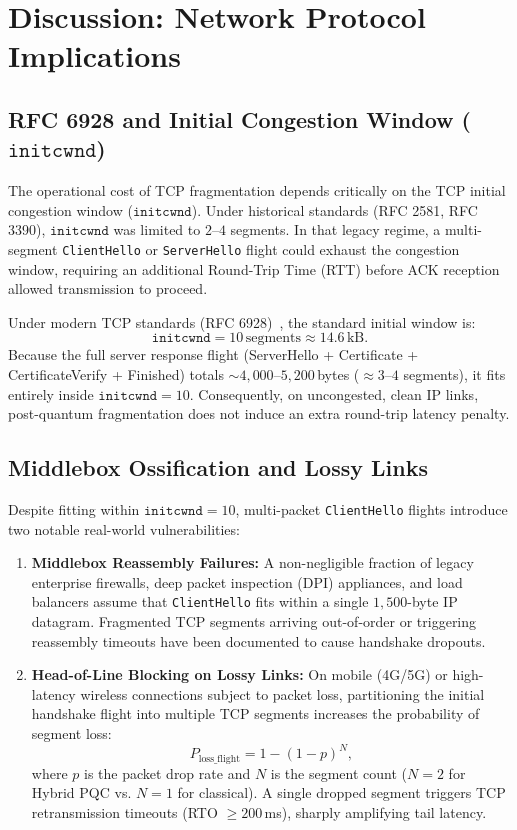 \section{Discussion: Network Protocol Implications}

\subsection{RFC 6928 and Initial Congestion Window (\texorpdfstring{$\texttt{initcwnd}$}{initcwnd})}
The operational cost of TCP fragmentation depends critically on the TCP initial congestion window ($\texttt{initcwnd}$). Under historical standards (RFC 2581, RFC 3390), $\texttt{initcwnd}$ was limited to $2\text{--}4$ segments. In that legacy regime, a multi-segment \texttt{ClientHello} or \texttt{ServerHello} flight could exhaust the congestion window, requiring an additional Round-Trip Time (RTT) before ACK reception allowed transmission to proceed.

Under modern TCP standards (RFC 6928)~\cite{chu2013}, the standard initial window is:
\begin{equation}
\texttt{initcwnd} = 10\,\mathrm{segments} \approx 14.6\,\mathrm{kB}.
\end{equation}
Because the full server response flight (ServerHello + Certificate + CertificateVerify + Finished) totals $\sim 4{,}000\text{--}5{,}200\,$bytes ($\approx 3\text{--}4$ segments), it fits entirely inside $\texttt{initcwnd} = 10$. Consequently, on uncongested, clean IP links, post-quantum fragmentation does not induce an extra round-trip latency penalty.

\subsection{Middlebox Ossification and Lossy Links}
Despite fitting within $\texttt{initcwnd} = 10$, multi-packet \texttt{ClientHello} flights introduce two notable real-world vulnerabilities:
\begin{enumerate}
    \item \textbf{Middlebox Reassembly Failures:} A non-negligible fraction of legacy enterprise firewalls, deep packet inspection (DPI) appliances, and load balancers assume that \texttt{ClientHello} fits within a single $1{,}500$-byte IP datagram. Fragmented TCP segments arriving out-of-order or triggering reassembly timeouts have been documented to cause handshake dropouts.
    \item \textbf{Head-of-Line Blocking on Lossy Links:} On mobile (4G/5G) or high-latency wireless connections subject to packet loss, partitioning the initial handshake flight into multiple TCP segments increases the probability of segment loss:
    \begin{equation}
    P_{\mathrm{loss\_flight}} = 1 - (1 - p)^N,
    \end{equation}
    where $p$ is the packet drop rate and $N$ is the segment count ($N=2$ for Hybrid PQC vs. $N=1$ for classical). A single dropped segment triggers TCP retransmission timeouts (RTO $\ge 200\,$ms), sharply amplifying tail latency.
\end{enumerate}

